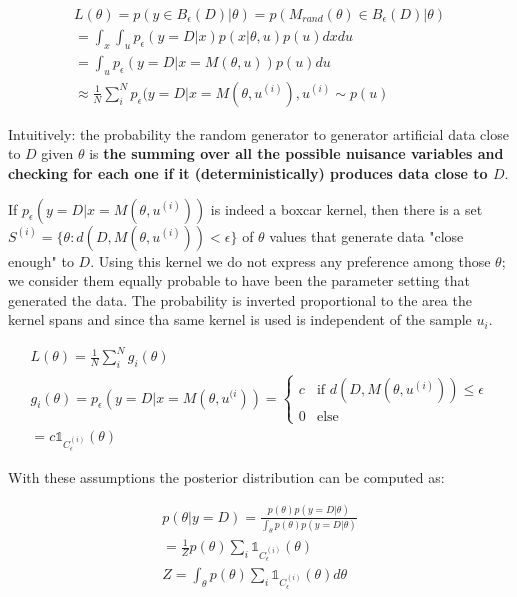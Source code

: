 \documentclass{article}
\begin{document}
\begin{gather} \label{eq:dual_view}
  L(\theta) = p(y \in B_\epsilon (D)|\theta) = p(M_{rand}(\theta) \in B_\epsilon (D)|\theta)\\
  = \int_x \int_u p_\epsilon(y=D|x)p(x|\theta, u) p(u)dxdu \\
  = \int_u p_\epsilon(y=D|x=M(\theta, u)) p(u)du \\
  \approx \frac{1}{N} \sum_i^N p_\epsilon (y=D|x=M(\theta, u^{(i)}), u^{(i)} \sim p(u)  
\end{gather}

Intuitively: the probability the random generator to generator artificial data close to $D$ given $\theta$ is \textbf{the summing over all the possible nuisance variables and checking for each one if it (deterministically) produces data close to $D$}.



If $p_\epsilon(y=D|x=M(\theta,u^{(i)}))$ is indeed a boxcar kernel, then there is a set $S^{(i)} = \{ \theta: d(D, M(\theta, u^{(i)})) < \epsilon \}$ of $\theta$ values that generate data "close enough" to $D$. Using this kernel we do not express any preference among those $\theta$; we consider them equally probable to have been the parameter setting that generated the data. The probability is inverted proportional to the area the kernel spans and since tha same kernel is used is independent of the sample $u_i$.


\begin{gather} \label{eq:dual_view_analysis}
  L(\theta) = \frac{1}{N} \sum_{i}^Ng_i(\theta) \\
  g_i(\theta) = p_\epsilon(y=D|x=M(\theta, u^{(i}))
= \left\{
	\begin{array}{ll}
		c  & \mbox{if } d(D, M(\theta, u^{(i)})) \leq \epsilon \\
		0 & \mbox{else } 
	\end{array}
  \right. \\
  = c\mathbb{1}_{C_\epsilon^{(i)}}(\theta)
\end{gather}

With these assumptions the posterior distribution can be computed as:

\begin{gather} \label{eq:dual_view_analysis}
  p(\theta|y=D) = \frac{p(\theta)p(y=D|\theta)}{\int_\theta p(\theta)p(y=D|\theta)} \\
  = \frac{1}{Z}p(\theta) \sum_i \mathbb{1}_{C_\epsilon^{(i)}}(\theta) \\
  Z = \int_\theta p(\theta) \sum_i \mathbb{1}_{C_\epsilon^{(i)}}(\theta) d\theta
\end{gather}
\end{document}
